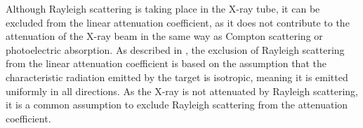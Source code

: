 Although Rayleigh scattering is taking place in the X-ray tube, it can be 
excluded from the linear attenuation coefficient, as it does not contribute to
the attenuation of the X-ray beam in the same way as Compton scattering or
photoelectric absorption. As described in \cite{poludniowski2022calculating}, the exclusion of Rayleigh scattering from the linear attenuation coefficient is based on the assumption that the characteristic radiation emitted by the target is isotropic, meaning it is emitted uniformly in all directions. As the X-ray is not attenuated by Rayleigh scattering, it is a common assumption to exclude Rayleigh scattering from the attenuation coefficient.
